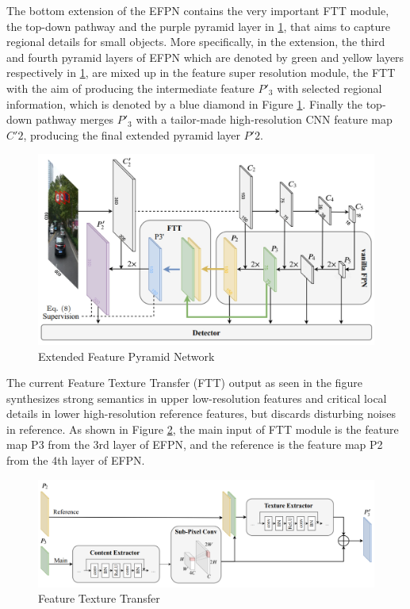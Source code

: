 The bottom extension of the EFPN  contains the very important FTT module, the top-down pathway and the purple pyramid layer in \ref{fig:efpn}, that aims to 
capture regional details for small objects. More specifically, in the extension, the third and fourth pyramid layers of EFPN which are denoted by green 
and yellow layers respectively in \ref{fig:efpn}, are mixed up in the feature super resolution module, the FTT with the aim of producing the intermediate 
feature $P'_{3}$ with selected regional information, which is denoted by a blue diamond in Figure \ref{fig:efpn}. Finally the top-down pathway merges $P'_{3}$ 
with a tailor-made high-resolution CNN feature map $C'2$, producing the final extended pyramid layer $P'2$.


\begin{figure}[h!]
    \centering
    \includegraphics[scale=0.15]{Figures/efpn.jpg}
    \caption{Extended Feature Pyramid Network}
    \label{fig:efpn}
\end{figure}

The current Feature Texture Transfer (FTT) output as seen in the figure  synthesizes strong semantics in upper low-resolution features and critical local details in lower high-resolution 
reference features, but discards disturbing noises in reference. As shown in Figure \ref{fig:ftt}, the main input of FTT module is the feature map P3
from the 3rd layer of EFPN, and the reference is the feature map P2 from the 4th layer of EFPN. 

\begin{figure}
    \centering
    \includegraphics[scale=0.18]{Figures/fft.png}
    \caption{Feature Texture Transfer}
    \label{fig:ftt}
\end{figure}

